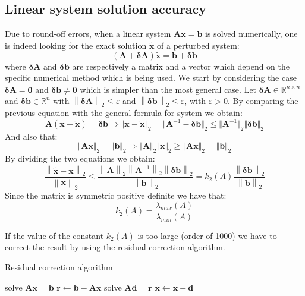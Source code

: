 \documentclass[12pt, a4paper]{report}
\begin{document}
    \subsection{Linear system solution accuracy}
    Due to round-off errors, when a linear system $\boldsymbol{Ax}=\boldsymbol{b}$ is solved numerically, one is indeed looking for the 
    exact solution $\widetilde{\boldsymbol{x}}$ of a perturbed system: 
    \[\left( \boldsymbol{A} + \boldsymbol{\delta A}\right)\widetilde{\boldsymbol{x}}=\boldsymbol{b}+\boldsymbol{\delta b}\]
    where $\boldsymbol{\delta A}$ and $\boldsymbol{\delta b}$ are respectively a matrix and a vector which depend on the specific 
    numerical method which is being used. We start by considering the case $\boldsymbol{\delta A}=\boldsymbol{0}$ and $\boldsymbol{\delta b}\neq\boldsymbol{0}$ which is 
    simpler than the most general case. Let $\boldsymbol{\delta A} \in \mathbb{R}^{n \times n}$ and $\boldsymbol{\delta b} \in \mathbb{R}^{n}$ with $\left\lVert \boldsymbol{\delta A} \right\rVert_2 \leq \varepsilon$ 
    and $\left\lVert \boldsymbol{\delta b} \right\rVert_2 \leq \varepsilon$, with $\varepsilon > 0$. By comparing the previous equation with the general formula for system we obtain: 
    \[\boldsymbol{A}\left(\boldsymbol{x}-\widetilde{\boldsymbol{x}}\right)=\boldsymbol{\delta b}\Rightarrow\Vert \boldsymbol{x}-\widetilde{\boldsymbol{x}} \Vert_2=\Vert \boldsymbol{A}^{-1}-\boldsymbol{\delta b} \Vert_2 \leq \Vert \boldsymbol{A}^{-1} \Vert_2 \Vert \boldsymbol{\delta b} \Vert_2\]
    And also that: 
    \[\Vert\boldsymbol{Ax}\Vert_2=\Vert\boldsymbol{b}\Vert_2 \Rightarrow \Vert\boldsymbol{A}\Vert_2\Vert\boldsymbol{x}\Vert_2 \geq \Vert\boldsymbol{Ax}\Vert_2=\Vert\boldsymbol{b}\Vert_2\]
    By dividing the two equations we obtain: 
    \[\dfrac{\left\lVert \widetilde{\boldsymbol{x}}-\boldsymbol{x} \right\rVert_2}{\left\lVert \boldsymbol{x} \right\rVert_2} \leq \dfrac{\left\lVert \boldsymbol{A} \right\rVert_2\left\lVert \boldsymbol{A}^{-1} \right\rVert_2\left\lVert \boldsymbol{\delta b} \right\rVert_2}{\left\lVert \boldsymbol{b} \right\rVert_2}=k_2(A)\dfrac{\left\lVert \boldsymbol{\delta b} \right\rVert_2}{\left\lVert \boldsymbol{b} \right\rVert_2}\]
    Since the matrix is symmetric positive definite we have that: 
    \[k_2(A)=\dfrac{\lambda_{max}(A)}{\lambda_{min}(A)}\]

    If the value of the constant $k_2(A)$ is too large (order of 1000) we have to correct the result by using the residual correction algorithm. 
    \begin{algorithm}[H]
        \caption{Residual correction algorithm}
            \begin{algorithmic}[1]
                \State solve $\boldsymbol{Ax}=\boldsymbol{b}$
                \State $\boldsymbol{r} \leftarrow \boldsymbol{b}-\boldsymbol{Ax}$
                \State solve $\boldsymbol{Ad}=\boldsymbol{r}$
                \State $\boldsymbol{x} \leftarrow \boldsymbol{x}+\boldsymbol{d}$
            \end{algorithmic}
    \end{algorithm}
\end{document}
